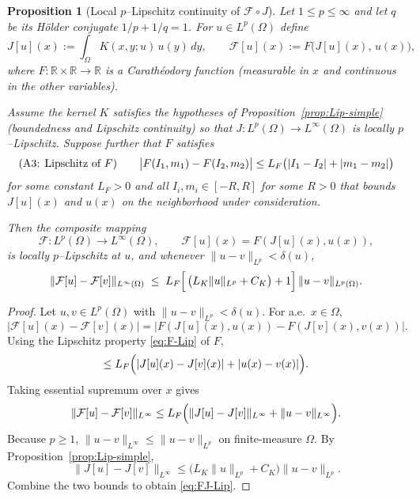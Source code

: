 \documentclass[11pt,a4paper]{article}
\theoremstyle{plain}
\newtheorem{proposition}[theorem]{Proposition}
\theoremstyle{definition}
\theoremstyle{remark}
\begin{document}
\begin{proposition}[Local $p$--Lipschitz continuity of $\mathcal F\!\circ\! J$]\label{prop:Lip-FJ}
	Let $1\le p\le\infty$ and let $q$ be its Hölder conjugate $1/p+1/q=1$.
	For $u\in L^p(\Omega)$ define
	\[
		J[u](x):=\int_\Omega K(x,y;u)\,u(y)\,dy,\qquad
		\mathcal F[u](x):=F\big(J[u](x),\,u(x)\big),
	\]
	where $F:\mathbb R\times\mathbb R\to\mathbb R$ is a Carathéodory function
	(measurable in $x$ and continuous in the other variables).

	Assume the kernel $K$ satisfies the hypotheses of
	Proposition~\ref{prop:Lip-simple} (boundedness and Lipschitz continuity)
	so that $J:L^p(\Omega)\to L^\infty(\Omega)$ is locally $p$–Lipschitz.
	Suppose further that $F$ satisfies
	\begin{equation}\label{eq:F-Lip}
		\text{\normalfont(A3: Lipschitz of $F$)}\qquad
		\bigl|F(I_1,m_1)-F(I_2,m_2)\bigr|
		\le L_F\bigl(|I_1-I_2|+|m_1-m_2|\bigr)
	\end{equation}
	for some constant $L_F>0$ and all $I_i,m_i\in[-R,R]$ for some $R>0$
	that bounds $J[u](x)$ and $u(x)$ on the neighborhood under consideration.

	Then the composite mapping
	\[
		\mathcal F:L^p(\Omega)\longrightarrow L^\infty(\Omega),
		\qquad
		\mathcal F[u](x)=F(J[u](x),u(x)),
	\]
	is locally $p$–Lipschitz at $u$, and whenever $\|u-v\|_{L^p}<\delta(u)$,
	\begin{equation}\label{eq:FJ-Lip}
		\|\mathcal F[u]-\mathcal F[v]\|_{L^\infty(\Omega)}
		\;\le\;
		L_F\Bigl[\,\bigl(L_K\|u\|_{L^p}+C_K\bigr)+1\Bigr]
		\,\|u-v\|_{L^p(\Omega)}.
	\end{equation}
\end{proposition}

\begin{proof}
	Let $u,v\in L^p(\Omega)$ with $\|u-v\|_{L^p}<\delta(u)$.
	For a.e.\ $x\in\Omega$,
	\[
		\bigl|\mathcal F[u](x)-\mathcal F[v](x)\bigr|
		=\bigl|F(J[u](x),u(x))-F(J[v](x),v(x))\bigr|.
	\]
	Using the Lipschitz property \eqref{eq:F-Lip} of $F$,
	\[
		\le L_F\Bigl(
		|J[u](x)-J[v](x)| + |u(x)-v(x)|
		\Bigr).
	\]
	Taking essential supremum over $x$ gives
	\[
		\|\mathcal F[u]-\mathcal F[v]\|_{L^\infty}
		\le L_F\Bigl(
		\|J[u]-J[v]\|_{L^\infty}
		+ \|u-v\|_{L^\infty}
		\Bigr).
	\]
	Because $p\ge 1$, $\|u-v\|_{L^\infty}\le \|u-v\|_{L^p}$ on finite-measure $\Omega$.
	By Proposition~\ref{prop:Lip-simple},
	\[
		\|J[u]-J[v]\|_{L^\infty}
		\le \bigl(L_K\|u\|_{L^p}+C_K\bigr)\|u-v\|_{L^p}.
	\]
	Combine the two bounds to obtain \eqref{eq:FJ-Lip}.
\end{proof}
\end{document}
